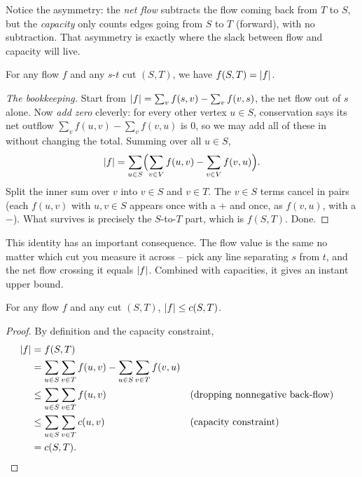 Notice the asymmetry: the \emph{net flow} subtracts the flow coming back from
$T$ to $S$, but the \emph{capacity} only counts edges going from $S$ to $T$
(forward), with no subtraction. That asymmetry is exactly where the slack
between flow and capacity will live.

\begin{lemma}
\label{ch26:lemma-cut-value}
For any flow $f$ and any $s$-$t$ cut $(S,T)$, we have $f(S,T) = \lvert f\rvert$.
\end{lemma}

\begin{proof}[The bookkeeping]
Start from $\lvert f\rvert = \sum_v f(s,v) - \sum_v f(v,s)$, the net flow out of $s$
alone. Now \emph{add zero} cleverly: for every other vertex $u \in S$,
conservation says its net outflow $\sum_v f(u,v) - \sum_v f(v,u)$ is $0$, so we
may add all of these in without changing the total. Summing over all $u \in S$,
\[
  \lvert f\rvert = \sum_{u \in S}\Bigl(\sum_{v \in V} f(u,v) - \sum_{v \in V} f(v,u)\Bigr).
\]
Split the inner sum over $v$ into $v \in S$ and $v \in T$. The $v \in S$ terms
cancel in pairs (each $f(u,v)$ with $u,v\in S$ appears once with a $+$ and
once, as $f(v,u)$, with a $-$). What survives is precisely the $S$-to-$T$ part,
which is $f(S,T)$. Done.
\end{proof}

This identity has an important consequence. The flow value is the same no
matter which cut you measure it across -- pick any line separating $s$ from $t$,
and the net flow crossing it equals $\lvert f\rvert$. Combined with capacities, it
gives an instant upper bound.

\begin{corollary}
\label{ch26:weak-duality}
For any flow $f$ and any cut $(S,T)$, $\lvert f\rvert \le c(S,T)$.
\end{corollary}

\begin{proof}
By definition and the capacity constraint,
\begin{align*}
  \lvert f\rvert &= f(S,T) \\
          &= \sum_{u \in S} \sum_{v \in T} f(u,v) - \sum_{u \in S} \sum_{v \in T} f(v,u) \\
          &\le \sum_{u \in S} \sum_{v \in T} f(u,v) && \text{(dropping nonnegative back-flow)} \\
          &\le \sum_{u \in S} \sum_{v \in T} c(u,v) && \text{(capacity constraint)} \\
          &= c(S,T).
\end{align*}
\end{proof}

